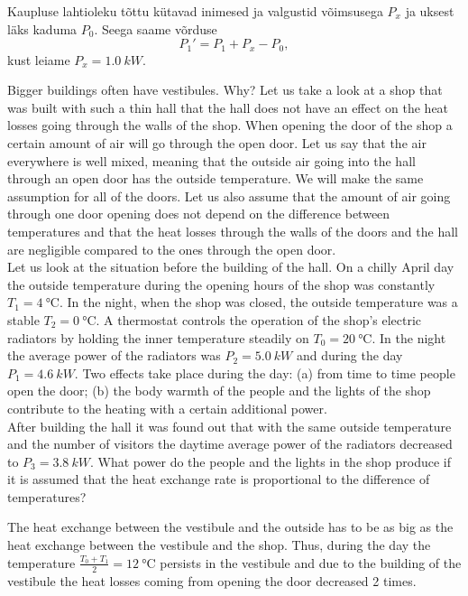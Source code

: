 {Kaupluse lahtioleku tõttu kütavad inimesed ja valgustid võimsusega $P_x$ ja uksest läks kaduma $P_0$. Seega saame võrduse
\[
P_1'=P_1+P_x-P_0,
\]
kust leiame $P_x=\SI{1,0}{kW}$.
\fi


\ifEngStatement
Bigger buildings often have vestibules. Why? Let us take a look at a shop that was built with such a thin hall that the hall does not have an effect on the heat losses going through the walls of the shop. When opening the door of the shop a certain amount of air will go through the open door. Let us say that the air everywhere is well mixed, meaning that the outside air going into the hall through an open door has the outside temperature. We will make the same assumption for all of the doors. Let us also assume that the amount of air going through one door opening does not depend on the difference between temperatures and that the heat losses through the walls of the doors and the hall are negligible compared to the ones through the open door.\\
Let us look at the situation before the building of the hall. On a chilly April day the outside temperature during the opening hours of the shop was constantly $T_1=\SI{4}{\celsius}$. In the night, when the shop was closed, the outside temperature was a stable $T_2=\SI{0}{\celsius}$. A thermostat controls the operation of the shop’s electric radiators by holding the inner temperature steadily on $T_0=\SI{20}{\celsius}$. In the night the average power of the radiators was $P_2= \SI{5,0}{kW}$ and during the day $P_1=\SI{4,6}{kW}$. Two effects take place during the day: (a) from time to time people open the door; (b) the body warmth of the people and the lights of the shop contribute to the heating with a certain additional power.\\
After building the hall it was found out that with the same outside temperature and the number of visitors the daytime average power of the radiators decreased to $P_3=\SI{3,8}{kW}$. What power do the people and the lights in the shop produce if it is assumed that the heat exchange rate is proportional to the difference of temperatures?
\fi


\ifEngHint
The heat exchange between the vestibule and the outside has to be as big as the heat exchange between the vestibule and the shop. Thus, during the day the temperature $\frac{T_0+T_1}{2}=\SI{12}{\celsius}$ persists in the vestibule and due to the building of the vestibule the heat losses coming from opening the door decreased 2 times.
\fi


}
